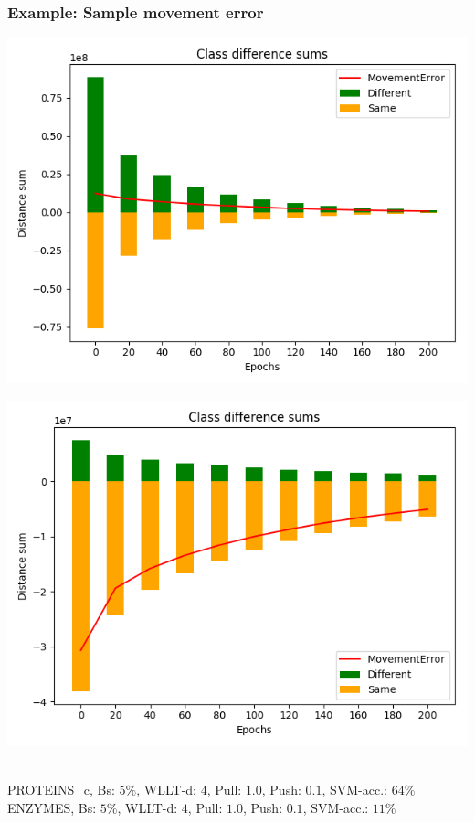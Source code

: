 \begin{frame}\frametitle{Example: Sample movement error}
	\begin{minipage}{0.49\textwidth}
		\includegraphics[width=\textwidth]{images/plot19ClDiffSums}
	\end{minipage}
	\begin{minipage}{0.49\textwidth}
		\includegraphics[width=\textwidth]{images/plot20ClDiffSums}
	\end{minipage}
	\vspace{2cm} \\
	\tiny{PROTEINS\_c, Bs: $5\%$, WLLT-d: $4$, Pull: $1.0$, Push: $0.1$, SVM-acc.: $64\%$}\\
	\tiny{ENZYMES, Bs: $5\%$, WLLT-d: $4$, Pull: $1.0$, Push: $0.1$, SVM-acc.: $11\%$}
\end{frame}


